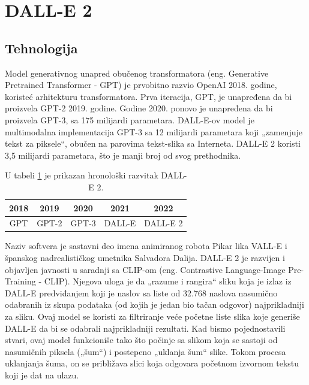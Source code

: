 \documentclass[a4paper]{article}
\begin{document}
\section{DALL-E 2}
\label{DALLE2}
\subsection{Tehnologija}
\label{subsec:tehnologija}
Model generativnog unapred obučenog transformatora (eng. Generative Pretrained Transformer - GPT) je prvobitno razvio OpenAI 2018. godine, koristeć arhitekturu transformatora. Prva iteracija, GPT, je unapređena da bi proizvela GPT-2 2019. godine. Godine 2020. ponovo je unapređena da bi proizvela GPT-3, sa 175 milijardi parametara. DALL-E-ov model je multimodalna implementacija GPT-3 sa 12 milijardi parametara koji „zamenjuje tekst za piksele“, obučen na parovima tekst-slika sa Interneta. DALL-E 2 koristi 3,5 milijardi parametara, što je manji broj od svog prethodnika.
\begin{table}[h!]
\begin{center}
\caption{U tabeli \ref{tab:tabela1} je prikazan hronološki razvitak DALL-E 2.} 
\vspace{0.5cm}
\begin{tabular}{|c|c|c|c|c|} \hline
2018&2019&2020&2021&2022\\ \hline
GPT&GPT-2&GPT-3 &DALL-E&DALL-E 2\\ \hline
\end{tabular}
\label{tab:tabela1}
\end{center}
\end{table}
Naziv softvera je sastavni deo imena animiranog robota Pikar lika VALL-E i španskog
nadrealističkog umetnika Salvadora Dalija. DALL-E 2 je razvijen i objavljen javnosti u saradnji sa CLIP-om (eng. Contrastive Language-Image Pre-Training - CLIP). Njegova uloga je da „razume i rangira“ sliku koja je izlaz iz DALL-E 
 predviđanjem koji je naslov sa liste od 32.768 naslova nasumično odabranih iz skupa podataka (od kojih je jedan bio tačan odgovor) najprikladniji za sliku. Ovaj model se koristi za filtriranje veće početne liste slika koje generiše DALL-E da bi se odabrali najprikladniji rezultati. Kad bismo pojednostavili stvari, ovaj model funkcioniše tako što počinje sa slikom koja se sastoji od nasumičnih piksela („šum“) i postepeno „uklanja šum“ slike. Tokom procesa uklanjanja
šuma, on se približava slici koja odgovara početnom izvornom tekstu koji je dat na ulazu.

\newpage
\end{document}

